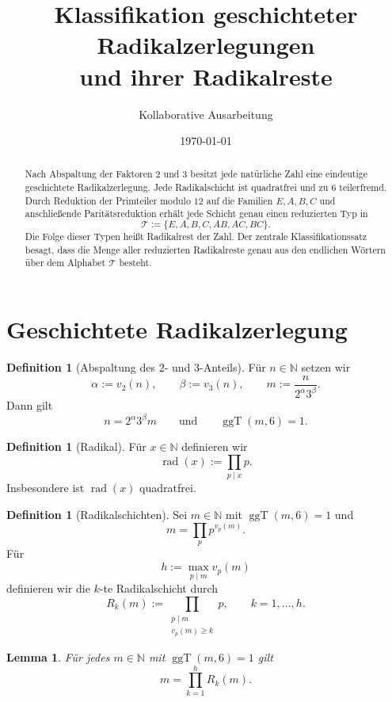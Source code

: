 \documentclass[11pt,a4paper]{article}
\title{Klassifikation geschichteter Radikalzerlegungen\\ und ihrer Radikalreste}
\author{Kollaborative Ausarbeitung}
\date{\today}
\newtheorem{lemma}[satz]{Lemma}
\theoremstyle{definition}
\newtheorem{definition}[satz]{Definition}
\theoremstyle{remark}
\newcommand{\N}{\mathbb{N}}
\newcommand{\rad}{\operatorname{rad}}
\newcommand{\ggT}{\operatorname{ggT}}
\begin{document}
	\maketitle
	
	\begin{abstract}
		Nach Abspaltung der Faktoren \(2\) und \(3\) besitzt jede natürliche Zahl eine eindeutige
		geschichtete Radikalzerlegung. Jede Radikalschicht ist quadratfrei und zu \(6\) teilerfremd.
		Durch Reduktion der Primteiler modulo \(12\) auf die Familien \(E,A,B,C\) und anschließende
		Paritätsreduktion erhält jede Schicht genau einen reduzierten Typ in
		\[
		\mathcal T:=\{E,A,B,C,AB,AC,BC\}.
		\]
		Die Folge dieser Typen heißt Radikalrest der Zahl. Der zentrale Klassifikationssatz besagt,
		dass die Menge aller reduzierten Radikalreste genau aus den endlichen Wörtern über dem Alphabet
		\(\mathcal T\) besteht.
	\end{abstract}
	
	\section{Geschichtete Radikalzerlegung}
	
	\begin{definition}[Abspaltung des \(2\)- und \(3\)-Anteils]
		Für \(n\in\N\) setzen wir
		\[
		\alpha:=v_2(n),\qquad \beta:=v_3(n),\qquad m:=\frac{n}{2^\alpha 3^\beta}.
		\]
		Dann gilt
		\[
		n=2^\alpha 3^\beta m
		\qquad\text{und}\qquad
		\ggT(m,6)=1.
		\]
	\end{definition}
	
	\begin{definition}[Radikal]
		Für \(x\in\N\) definieren wir
		\[
		\rad(x):=\prod_{p\mid x} p.
		\]
		Insbesondere ist \(\rad(x)\) quadratfrei.
	\end{definition}
	
	\begin{definition}[Radikalschichten]
		Sei \(m\in\N\) mit \(\ggT(m,6)=1\) und
		\[
		m=\prod_p p^{v_p(m)}.
		\]
		Für
		\[
		h:=\max_{p\mid m} v_p(m)
		\]
		definieren wir die \(k\)-te Radikalschicht durch
		\[
		R_k(m):=\prod_{\substack{p\mid m\\ v_p(m)\ge k}} p,
		\qquad k=1,\dots,h.
		\]
	\end{definition}
	
	\begin{lemma}
		Für jedes \(m\in\N\) mit \(\ggT(m,6)=1\) gilt
		\[
		m=\prod_{k=1}^{h}R_k(m).
		\]
	\end{lemma}
	
\end{document}
